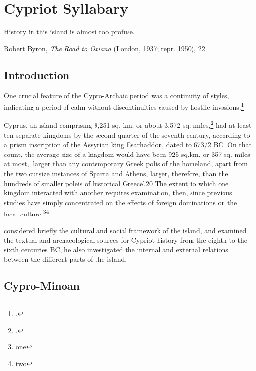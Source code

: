 \newfontfamily{}

\newfontfamily{}

\chapter{Cypriot Syllabary}
\label{s:cypriot}

\epigraph{History in this island is almost too profuse.}
{Robert Byron, \textit{The Road to Oxiana} (London, 1937; repr. 1950), 22}
\section{Introduction}

One crucial feature of the Cypro-Archaic period was a continuity of styles, indicating a period of calm without discontinuities caused by hostile invasions.\footcite[page 4, \ldots different foreign powers were perhaps less hostile than is
generally thought. The crucial feature of the Cypro-Archaic period was
not the series of disruptions apparently resulting from invasion, but the
continuity of styles evident in the archaeology.]{Reyes1994} 


Cyprus, an island comprising 9,251 sq. km. or about 3,572 sq. miles,\footcite{Reyes1994} had at least ten separate
kingdoms by the second quarter of the seventh century, according to a prism inscription of the Assyrian king Esarhaddon, dated to 673/2 BC. On that count, the average size of a kingdom would have been 925 sq.km. or 357 sq. miles at most, 'larger than any contemporary Greek polis of the homeland, apart from the two outsize instances of Sparta and
Athens, larger, therefore, than the hundreds of smaller poleis of historical Greece'.20 The extent to which one kingdom interacted with another requires examination, then, since previous studies have simply concentrated on the effects of foreign dominations on the local culture.\footnote{one}\footnote{two} 

\citeauthor{Reyes1994} considered briefly the cultural and social framework of the island, and examined the textual and archaeological sources for Cypriot history from the eighth to the sixth centuries BC, he also investigated the internal and external relations between the different parts of the island.

\section{Cypro-Minoan}

